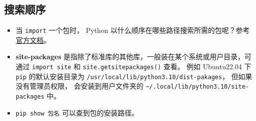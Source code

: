 \subsection{搜索顺序}
\begin{itemize}
\item 当 \verb`import` 一个包时， Python 以什么顺序在哪些路径搜索所需的包呢？参考\href{https://docs.python.org/3/tutorial/modules.html#the-module-search-path}{官方文档}。
\item \textbf{site-packages} 是指除了标准库的其他库，一般装在某个系统或用户目录，可通过 \verb`import site` 和 \verb`site.getsitepackages()` 查看。  例如 Ubuntu22.04 下 \verb`pip` 的默认安装目录为 \verb`/usr/local/lib/python3.10/dist-pakages`， 但如果没有管理员权限， 会安装到用户文件夹的 \verb`~/.local/lib/python3.10/site-packages` 中。
\item \verb`pip show 包名` 可以查到包的安装路径。 
\end{itemize}
